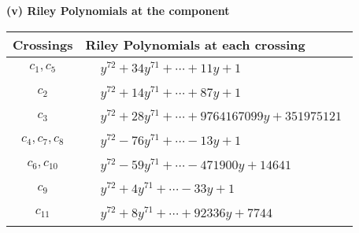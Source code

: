 \documentclass[1p]{elsarticle_modified}
\theoremstyle{definition}
\begin{document}
\flushleft \textbf{(v) Riley Polynomials at the component}\newline \\
\begin{tabular}{m{50pt}|m{274pt}}
Crossings & \hspace{64pt}Riley Polynomials at each crossing \\
\hline $$\begin{aligned}c_{1},c_{5}\end{aligned}$$&$\begin{aligned}
&y^{72}+34 y^{71}+\cdots+11 y+1
\end{aligned}$\\
\hline $$\begin{aligned}c_{2}\end{aligned}$$&$\begin{aligned}
&y^{72}+14 y^{71}+\cdots+87 y+1
\end{aligned}$\\
\hline $$\begin{aligned}c_{3}\end{aligned}$$&$\begin{aligned}
&y^{72}+28 y^{71}+\cdots+9764167099 y+351975121
\end{aligned}$\\
\hline $$\begin{aligned}c_{4},c_{7},c_{8}\end{aligned}$$&$\begin{aligned}
&y^{72}-76 y^{71}+\cdots-13 y+1
\end{aligned}$\\
\hline $$\begin{aligned}c_{6},c_{10}\end{aligned}$$&$\begin{aligned}
&y^{72}-59 y^{71}+\cdots-471900 y+14641
\end{aligned}$\\
\hline $$\begin{aligned}c_{9}\end{aligned}$$&$\begin{aligned}
&y^{72}+4 y^{71}+\cdots-33 y+1
\end{aligned}$\\
\hline $$\begin{aligned}c_{11}\end{aligned}$$&$\begin{aligned}
&y^{72}+8 y^{71}+\cdots+92336 y+7744
\end{aligned}$\\
\hline
\end{tabular}\\~\\
\end{document}
